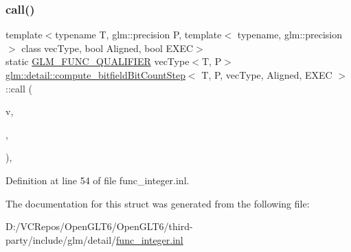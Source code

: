 \subsubsection{\texorpdfstring{call()}{call()}}
{\footnotesize\ttfamily template$<$typename T, glm\+::precision P, template$<$ typename, glm\+::precision $>$ class vec\+Type, bool Aligned, bool E\+X\+EC$>$ \\
static \mbox{\hyperlink{setup_8hpp_a33fdea6f91c5f834105f7415e2a64407}{G\+L\+M\+\_\+\+F\+U\+N\+C\+\_\+\+Q\+U\+A\+L\+I\+F\+I\+ER}} vec\+Type$<$T, P$>$ \mbox{\hyperlink{structglm_1_1detail_1_1compute__bitfield_bit_count_step}{glm\+::detail\+::compute\+\_\+bitfield\+Bit\+Count\+Step}}$<$ T, P, vec\+Type, Aligned, E\+X\+EC $>$\+::call (\begin{DoxyParamCaption}\item[{vec\+Type$<$ T, P $>$ const \&}]{v,  }\item[{T}]{,  }\item[{T}]{ }\end{DoxyParamCaption})\hspace{0.3cm}{\ttfamily [inline]}, {\ttfamily [static]}}



Definition at line 54 of file func\+\_\+integer.\+inl.



The documentation for this struct was generated from the following file\+:\begin{DoxyCompactItemize}
\item 
D\+:/\+V\+C\+Repos/\+Open\+G\+L\+T6/\+Open\+G\+L\+T6/third-\/party/include/glm/detail/\mbox{\hyperlink{func__integer_8inl}{func\+\_\+integer.\+inl}}\end{DoxyCompactItemize}
